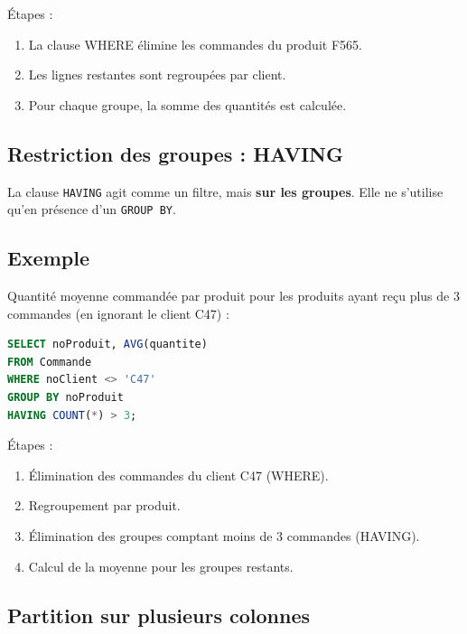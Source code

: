 Étapes :
\begin{enumerate}
    \item La clause WHERE élimine les commandes du produit F565.
    \item Les lignes restantes sont regroupées par client.
    \item Pour chaque groupe, la somme des quantités est calculée.
\end{enumerate}


\subsection{Restriction des groupes : HAVING}

La clause \texttt{HAVING} agit comme un filtre, mais \textbf{sur les groupes}.  
Elle ne s’utilise qu’en présence d’un \texttt{GROUP BY}.

\subsection*{Exemple}

Quantité moyenne commandée par produit pour les produits ayant reçu plus de 3 commandes (en ignorant le client C47) :

\begin{sqlcodebox}
\begin{lstlisting}[language=SQL]
SELECT noProduit, AVG(quantite)
FROM Commande
WHERE noClient <> 'C47'
GROUP BY noProduit
HAVING COUNT(*) > 3;
\end{lstlisting}
\end{sqlcodebox}

Étapes :
\begin{enumerate}
    \item Élimination des commandes du client C47 (WHERE).
    \item Regroupement par produit.
    \item Élimination des groupes comptant moins de 3 commandes (HAVING).
    \item Calcul de la moyenne pour les groupes restants.
\end{enumerate}


\subsection{Partition sur plusieurs colonnes}

